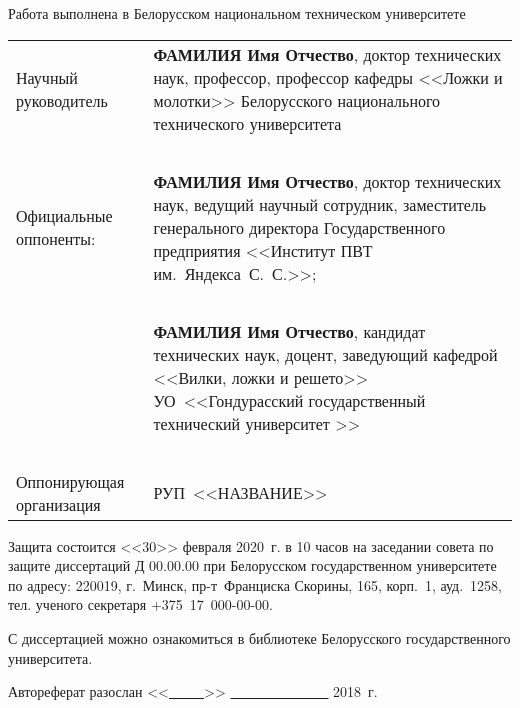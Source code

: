 \newpage
\pagestyle{empty}
Работа выполнена в Белорусском национальном техническом \linebreak университете

\vspace*{-4mm}
\begin{table*}[h!]
\hspace*{-4mm}
\begin{tabular}{p{65mm} p{94mm}}

{Научный руководитель} & {\textbf{ФАМИЛИЯ Имя Отчество}, доктор технических наук, профессор, профессор кафедры <<Ложки и молотки>> Белорусского национального технического университета} \tabularnewline 

~&~ \tabularnewline 

{Официальные оппоненты:} & \textbf{ФАМИЛИЯ Имя Отчество}, доктор технических наук, ведущий научный сотрудник, заместитель генерального директора Государственного предприятия <<Институт ПВТ \linebreak им.~Яндекса~С.~С.>>;
\tabularnewline 

~&~ \tabularnewline 

~ & \textbf{ФАМИЛИЯ Имя Отчество}, кандидат технических наук, доцент, заведующий кафедрой <<Вилки, ложки и решето>> УО~<<Гондурасский государственный технический университет >>
\tabularnewline 

~&~ \tabularnewline 

{Оппонирующая организация} & РУП~<<НАЗВАНИЕ>>

\end{tabular}
\end{table*}

\vspace*{-6mm}
Защита состоится
<<30>> февраля 2020~г.
в 10 часов
на заседании совета по защите диссертаций Д 00.00.00
при Белорусском государственном университете
по адресу: 220019, г.~Минск, пр-т~Франциска Скорины, 165, корп.~1, ауд.~1258,
тел. ученого секретаря \mbox{+375~17~000-00-00}.

С диссертацией можно ознакомиться в библиотеке Белорусского государственного университета.

Автореферат разослан <<\underline{~~~~~}>> \underline{~~~~~~~~~~~~~~} 2018~г.

